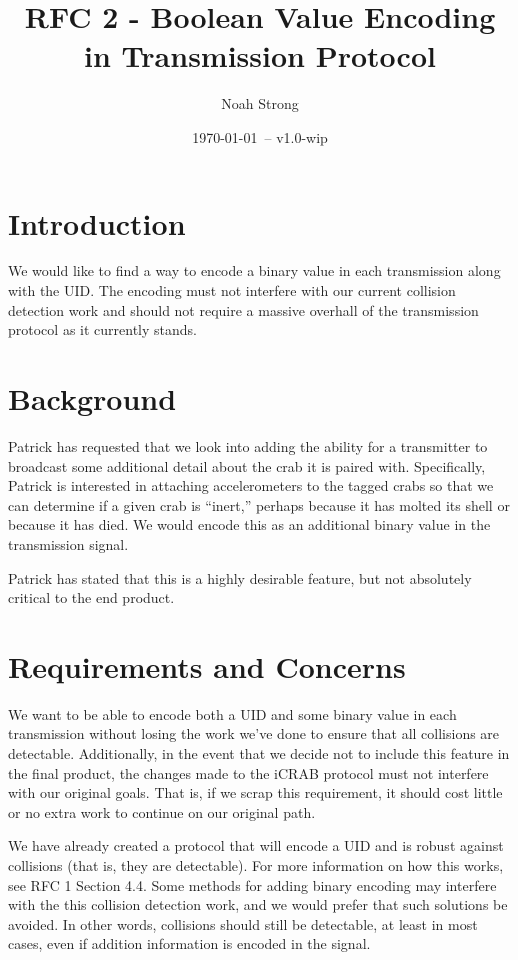 \documentclass[12pt]{article}
\title{RFC 2 - Boolean Value Encoding in Transmission Protocol}
\author{
	Noah Strong
}
\date{\today\ -- v1.0-wip}
\begin{document}
\maketitle

\tableofcontents{}

\section{Introduction}

We would like to find a way to encode a binary value in each transmission
along with the UID.
The encoding must not interfere with our current collision detection work
and should not require a massive overhall of the transmission protocol as it
currently stands.

\section{Background}

Patrick has requested that we look into adding the ability for a transmitter to
broadcast some additional detail about the crab it is paired with.
Specifically, Patrick is interested in attaching accelerometers to the tagged
crabs so that we can determine if a given crab is ``inert,'' perhaps because it
has molted its shell or because it has died. We would encode this as an
additional binary value in the transmission signal.

Patrick has stated that this is a highly desirable feature, but not absolutely
critical to the end product.

\section{Requirements and Concerns}

We want to be able to encode both a UID and some binary value in each
transmission without losing the work we've done to ensure that all collisions
are detectable. Additionally, in the event that we decide not to include this
feature in the final product, the changes made to the iCRAB protocol must not
interfere with our original goals. That is, if we scrap this requirement, it
should cost little or no extra work to continue on our original path.

We have already created a protocol that will encode a UID and is robust against
collisions (that is, they are detectable).
For more information on how this works, see RFC 1 Section 4.4.
Some methods for adding binary encoding may interfere with the this collision
detection work, and we would prefer that such solutions be avoided.
In other words, collisions should still be detectable, at least in most cases,
even if addition information is encoded in the signal.
\end{document}
